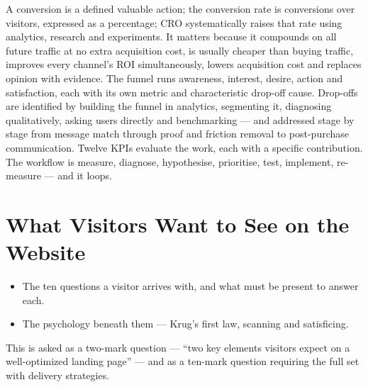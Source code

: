 \documentclass{MMTextbook}
\begin{document}
\begin{summarybox}
A conversion is a defined valuable action; the conversion rate is conversions over
visitors, expressed as a percentage; CRO systematically raises that rate using
analytics, research and experiments. It matters because it compounds on all future
traffic at no extra acquisition cost, is usually cheaper than buying traffic,
improves every channel's ROI simultaneously, lowers acquisition cost and replaces
opinion with evidence. The funnel runs awareness, interest, desire, action and
satisfaction, each with its own metric and characteristic drop-off cause. Drop-offs
are identified by building the funnel in analytics, segmenting it, diagnosing
qualitatively, asking users directly and benchmarking --- and addressed stage by
stage from message match through proof and friction removal to post-purchase
communication. Twelve KPIs evaluate the work, each with a specific contribution.
The workflow is measure, diagnose, hypothesise, prioritise, test, implement,
re-measure --- and it loops.
\end{summarybox}

\chapter{What Visitors Want to See on the Website}


\begin{learningoutcomes}
\begin{itemize}
\item The ten questions a visitor arrives with, and what must be present to
      answer each.
\item The psychology beneath them --- Krug's first law, scanning and satisficing.
\end{itemize}
\end{learningoutcomes}

\begin{keybox}
This is asked as a two-mark question --- ``two key elements visitors expect on a
well-optimized landing page'' --- and as a ten-mark question requiring the full
set with delivery strategies.
\end{keybox}
\end{document}
